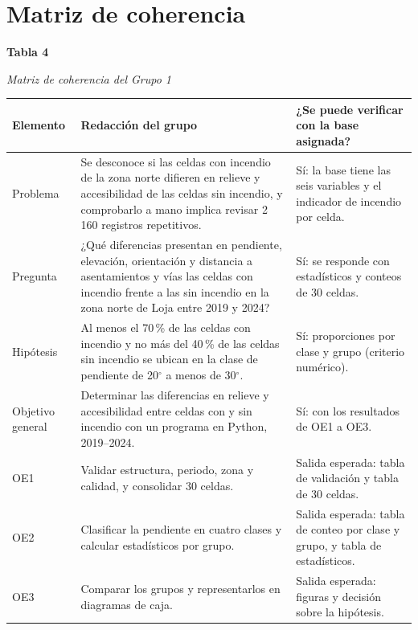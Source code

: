 \documentclass[11pt,a4paper]{article}
\newcommand{\gr}[1]{$#1^{\circ}$}
\newcommand{\apatabla}[2]{\par\needspace{9\baselineskip}\vspace{6pt}\noindent\textbf{Tabla #1}\par\noindent\textit{#2}\par\vspace{2pt}}
\newcommand{\apanota}[1]{\par\noindent{\footnotesize\textit{Nota.} #1}\par\vspace{6pt}}
\begin{document}
\section{Matriz de coherencia}
\apatabla{4}{Matriz de coherencia del Grupo 1}
\small
\begin{tabularx}{\linewidth}{>{\raggedright\arraybackslash}p{2.2cm} X >{\raggedright\arraybackslash}p{4.4cm}}
\toprule
\textbf{Elemento} & \textbf{Redacción del grupo} & \textbf{¿Se puede verificar con la base asignada?}\\
\midrule
Problema & Se desconoce si las celdas con incendio de la zona norte difieren en relieve y accesibilidad de las celdas sin incendio, y comprobarlo a mano implica revisar 2\,160 registros repetitivos. & Sí: la base tiene las seis variables y el indicador de incendio por celda.\\
Pregunta & ¿Qué diferencias presentan en pendiente, elevación, orientación y distancia a asentamientos y vías las celdas con incendio frente a las sin incendio en la zona norte de Loja entre 2019 y 2024? & Sí: se responde con estadísticos y conteos de 30 celdas.\\
Hipótesis & Al menos el 70\,\% de las celdas con incendio y no más del 40\,\% de las celdas sin incendio se ubican en la clase de pendiente de 20\gr{} a menos de 30\gr{}. & Sí: proporciones por clase y grupo (criterio numérico).\\
Objetivo general & Determinar las diferencias en relieve y accesibilidad entre celdas con y sin incendio con un programa en Python, 2019--2024. & Sí: con los resultados de OE1 a OE3.\\
OE1 & Validar estructura, periodo, zona y calidad, y consolidar 30 celdas. & Salida esperada: tabla de validación y tabla de 30 celdas.\\
OE2 & Clasificar la pendiente en cuatro clases y calcular estadísticos por grupo. & Salida esperada: tabla de conteo por clase y grupo, y tabla de estadísticos.\\
OE3 & Comparar los grupos y representarlos en diagramas de caja. & Salida esperada: figuras y decisión sobre la hipótesis.\\
\bottomrule
\end{tabularx}
\normalsize
\apanota{Elaboración propia.}
\end{document}
